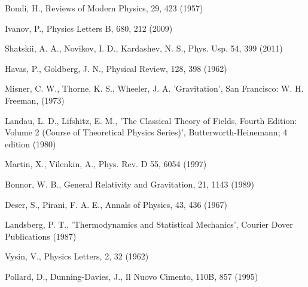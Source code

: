 \documentclass[aip,nofootinbib]{revtex4}
\begin{document}
\begin{thebibliography}{}

 Bondi, H., Reviews of Modern Physics, 29, 423 (1957)


 Ivanov, P., Physics Letters B,  680, 212 (2009)

 Shatskii, A. A., Novikov, I. D., Kardashev, N. S., Phys. Usp. 54, 399 (2011)


 Havas, P., Goldberg, J. N., Physical Review, 128, 398
(1962)

 Misner, C. W., Thorne, K. S., Wheeler, J. A.
'Gravitation', San Francisco: W. H. Freeman, (1973)


 Landau, L. D., Lifshitz, E. M.,
'The Classical Theory of Fields, Fourth Edition: Volume 2 (Course
of Theoretical Physics Series)', Butterworth-Heinemann; 4 edition
(1980)

 Martin, X., Vilenkin, A., Phys. Rev. D 55, 6054 (1997)

  Bonnor, W. B., General Relativity and Gravitation, 21, 1143 (1989)

 Deser, S., Pirani, F. A. E., Annals of Physics, 43, 436 (1967)

  Landsberg, P. T., 'Thermodynamics and Statistical Mechanics', Courier Dover Publications
(1987)

 Vysin, V., Physics Letters, 2, 32 (1962)

 Pollard, D., Dunning-Davies, J., Il Nuovo Cimento,
110B, 857 (1995)




\end{thebibliography}
\end{document}
